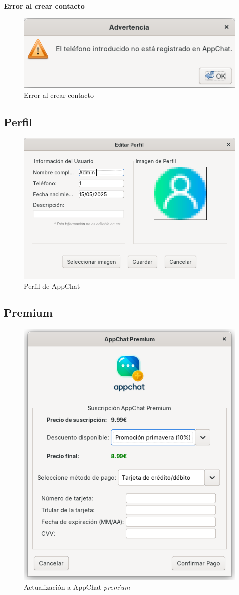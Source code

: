 \documentclass[11pt]{article}
\begin{document}
\textbf{Error al crear contacto}

\begin{figure}[H]
	\centering
	\includegraphics[width=0.4\linewidth]{figures/error-add-contact}
	\caption{Error al crear contacto}
	\label{fig:error-add-contact}
\end{figure}

\subsection{Perfil}

\begin{figure}[H]
	\centering
	\includegraphics[width=0.65\linewidth]{figures/profile}
	\caption{Perfil de AppChat}
	\label{fig:profile}
\end{figure}

\subsection{Premium}

\begin{figure}[H]
	\centering
	\includegraphics[width=0.35\linewidth]{figures/premium}
	\caption{Actualización a AppChat \textit{premium}}
	\label{fig:premium}
\end{figure}
\end{document}
